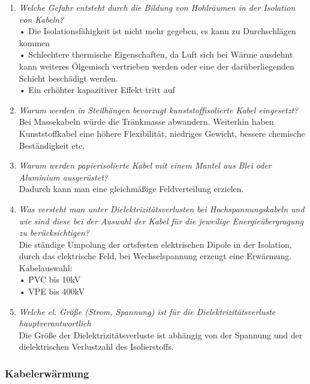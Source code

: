\documentclass[12pt]{article}
\begin{document}
\begin{enumerate}
    \item \textit{Welche Gefahr entsteht durch die Bildung von 
    Hohlräumen in der Isolation von Kabeln?}\\
    • Die Isolationsfähigkeit ist nicht mehr gegeben, es kann zu Durchschlägen kommen \\
    • Schlechtere thermische Eigenschaften, da Luft sich bei 
    Wärme ausdehnt kann weiteres Ölgemisch vertrieben werden oder eine der darüberliegenden Schicht beschädigt werden.\\
    • Ein erhöhter kapazitiver Effekt tritt auf\\
    \item \textit{Warum werden in Steilhängen bevorzugt 
    kunststoffisolierte Kabel eingesetzt?}\\
    Bei Massekabeln würde die Tränkmasse abwandern. Weiterhin haben Kunststoffkabel eine höhere Flexibilität, niedriges Gewicht, bessere chemische Beständigkeit etc.
    \item \textit{Warum werden papierisolierte Kabel mit einem 
    Mantel aus Blei oder Aluminium ausgerüstet?}\\
    Dadurch kann man eine gleichmäßige Feldverteilung erzielen.
    \item \textit{Was versteht man unter Dielektrizitätsverlusten bei 
    Hochspannungskabeln und wie sind diese bei der 
    Auswahl der Kabel für die jeweilige 
    Energieübergragung zu berücksichtigen? }\\
    Die ständige Umpolung der ortsfesten elektrischen Dipole in der Isolation, durch das elektrische Feld, 
    bei Wechselspannung erzeugt eine Erwärmung. \\
    Kabelauswahl: \\
    • PVC bis 10kV \\
    • VPE bis 400kV \\
    \item \textit{Welche el. Größe (Strom, Spannung) ist für die 
    Dielektrizitätsverluste hauptverantwortlich}\\
    Die Größe der Dielektrizitätsverluste ist abhängig von der Spannung und der dielektrischen 
    Verlustzahl des Isolierstoffs.
\end{enumerate}




\subsubsection{Kabelerwärmung}
\end{document}
